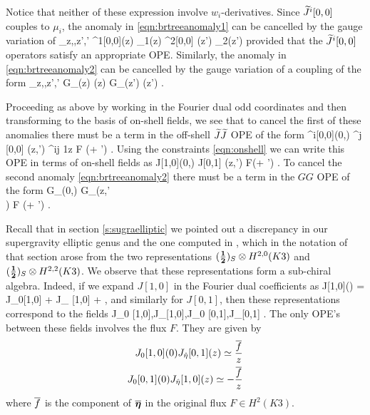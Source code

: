 \documentclass[../main.tex]{subfiles}
\begin{document}
Notice that neither of these expression involve $w_i$-derivatives. 
Since $\widetilde{J}^i[0,0]$ couples to $\mu_i$, the anomaly in \eqref{eqn:brtreeanomaly1} can be cancelled by the gauge variation of 
\beqn
\int_{z,\bfeta,z',\bfeta'} ^1[0,0](z) \mu_1(z) ^2[0,0] (z') \mu_2(z')
\eeqn
provided that the $\widetilde{J}^i[0,0]$ operators satisfy an appropriate OPE. 
Similarly, the anomaly in \eqref{eqn:brtreeanomaly2} can be cancelled by the gauge variation of a coupling of the form
\beqn
\int_{z,\bfeta,z',\bfeta'} G_\alpha[0,0](z) \alpha(z) G_\gamma[0,0] (z') \gamma (z') .
\eeqn

Proceeding as above by working in the Fourier dual odd coordinates and then transforming to the basis of on-shell fields, we see that to cancel the first of these anomalies there must be a term in the off-shell $\widetilde J \widetilde J$ OPE of the form
\beqn
{}^i[0,0](0,\what\bfeta) ^j [0,0] (z,\what\bfeta') \simeq \ep^{ij} \frac1z \what F (\what\bfeta + \what\bfeta') .
\eeqn
Using the constraints \eqref{eqn:onshell} we can write this OPE in terms of on-shell fields as
\beqn
J[1,0](0,\what \bfeta) J[0,1] (z,\what \bfeta') \simeq {} \what F(\what \bfeta + \what \bfeta') .
\eeqn
To cancel the second anomaly \eqref{eqn:brtreeanomaly2} there must be a term in the $GG$ OPE of the form
\beqn
G_\alpha[0,0](0,\what \bfeta) G_\gamma[0,0](z,\what \bfeta'\\) \simeq {} \what F (\what \bfeta + \what \bfeta') .
\eeqn

Recall that in section \ref{s:sugraelliptic} we pointed out a discrepancy in our supergravity elliptic genus and the one computed in \cite{deBoerEG}, which in the notation of that section arose from the two representations $(\frac{\bf 1}{\bf 2})_S \otimes H^{2,0}(K3)$ and $(\frac{\bf 1}{\bf 2})_S \otimes H^{2,2}(K3)$.
We observe that these representations form a sub-chiral algebra. 
Indeed, if we expand $J[1,0]$ in the Fourier dual coefficients as
\beqn
J[1,0](\what \bfeta) = J_0[1,0] + \what \eta J_{\what \eta} [1,0] + \cdots ,
\eeqn
and similarly for $J[0,1]$, then these representations correspond to the fields 
\beqn
J_0 [1,0],J_{\what \eta}[1,0],J_0 [0,1],J_{\what \eta}[0,1] .
\eeqn
The only OPE's between these fields involves the flux $F$.
They are given by
\begin{align*}
J_0 [1,0](0) J_{\Hat \eta} [0,1] (z) \simeq \frac{\overline f}{z}  \\ 
J_0[0,1] (0) J_{\Hat \eta} [1,0] (z) \simeq - \frac{\overline f}{z} 
\end{align*}
where $\overline f$ is the component of $\overline {\boldsymbol\eta}$ in the original flux $F \in H^2(K3)$.
\end{document}
